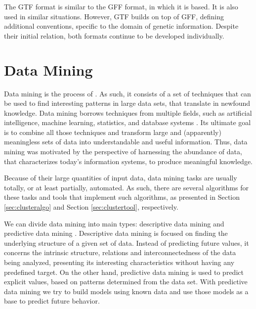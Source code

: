 The GTF format is similar to the GFF format, in which it is based. It is also
used in similar situations. However, GTF builds on top of GFF, defining
additional conventions, specific to the domain of genetic information. Despite
their initial relation, both formats continue to be developed individually.

\section{Data Mining}\label{sec:mlearning}


Data mining is the process of  \cite[p. 5]{han2006data}. As such, it consists of a
set of techniques that can be used to find interesting patterns in large data
sets, that translate in newfound knowledge. Data mining borrows techniques from
multiple fields, such as artificial intelligence, machine learning, statistics,
and database systems \cite{Chakrabarti2012}. Its ultimate goal is to combine all
those techniques and transform large and (apparently) meaningless sets of data
into understandable and useful information. Thus, data mining was motivated by
the perspective of harnessing the abundance of data, that characterizes today's
information systems, to produce meaningful knowledge.

Because of their large quantities of input data, data mining tasks are usually
totally, or at least partially, automated. As such, there are several algorithms
for these tasks and tools that implement such algorithms, as presented in
Section \ref{sec:clusteralgo} and Section \ref{sec:clustertool}, respectively.

We can divide data mining into main types: descriptive data mining and
predictive data mining \cite{Fayyad1996}. Descriptive data mining is focused on
finding the underlying structure of a given set of data. Instead of predicting
future values, it concerns the intrinsic structure, relations and
interconnectedness of the data being analyzed, presenting its interesting
characteristics without having any predefined target. On the other hand,
predictive data mining is used to predict explicit values, based on patterns
determined from the data set. With predictive data mining we try to build models
using known data and use those models as a base to predict future behavior.


